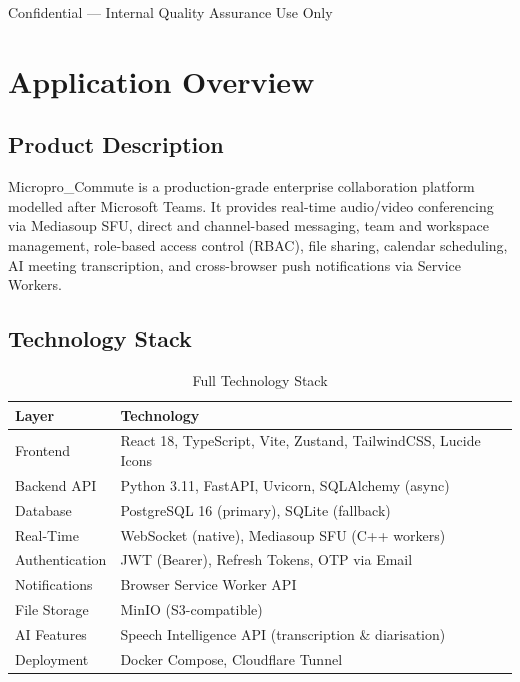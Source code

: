 \documentclass[11pt,a4paper]{report}
\begin{document}
\begin{titlepage}
\vfill{\small\color{muted}Confidential --- Internal Quality Assurance Use Only}
\end{titlepage}

\tableofcontents
\clearpage

\chapter{Application Overview}

\section{Product Description}
Micropro\_Commute is a production-grade enterprise collaboration platform modelled after Microsoft Teams. It provides real-time audio/video conferencing via Mediasoup SFU, direct and channel-based messaging, team and workspace management, role-based access control (RBAC), file sharing, calendar scheduling, AI meeting transcription, and cross-browser push notifications via Service Workers.

\section{Technology Stack}

\begin{xltabular}{\textwidth}{|L{3.5cm}|X|}
\caption{Full Technology Stack} \\
\hline
{} \textbf{Layer} & \textbf{Technology} \\ \hline
\endhead
Frontend        & React 18, TypeScript, Vite, Zustand, TailwindCSS, Lucide Icons \\ \hline
Backend API     & Python 3.11, FastAPI, Uvicorn, SQLAlchemy (async) \\ \hline
Database        & PostgreSQL 16 (primary), SQLite (fallback) \\ \hline
Real-Time       & WebSocket (native), Mediasoup SFU (C++ workers) \\ \hline
Authentication  & JWT (Bearer), Refresh Tokens, OTP via Email \\ \hline
Notifications   & Browser Service Worker API \\ \hline
File Storage    & MinIO (S3-compatible) \\ \hline
AI Features     & Speech Intelligence API (transcription \& diarisation) \\ \hline
Deployment      & Docker Compose, Cloudflare Tunnel \\ \hline
\end{xltabular}
\end{document}

